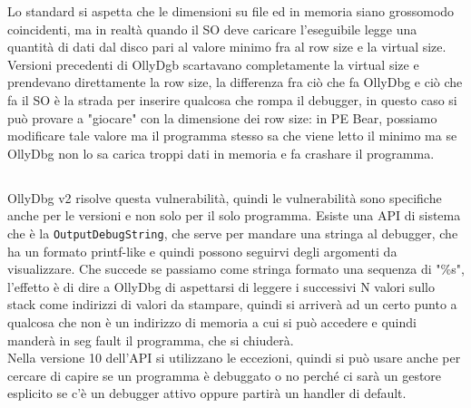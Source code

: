 \documentclass[12pt, oneside]{extbook}
\begin{document}
Lo standard si aspetta che le dimensioni su file ed in memoria siano grossomodo coincidenti, ma in realtà quando il SO deve caricare l'eseguibile legge una quantità di dati dal disco pari al valore minimo fra al row size e la virtual size.\\Versioni precedenti di OllyDgb scartavano completamente la virtual size e prendevano direttamente la row size, la differenza fra ciò che fa OllyDbg e ciò che fa il SO è la strada per inserire qualcosa che rompa il debugger, in questo caso si può provare a "giocare" con la dimensione dei row size:  in PE Bear, possiamo modificare tale valore ma il programma stesso sa che viene letto il minimo ma se OllyDbg non lo sa carica troppi dati in memoria e fa crashare il programma.
\subsection{}
OllyDbg v2 risolve questa vulnerabilità, quindi le vulnerabilità sono specifiche anche per le versioni e non solo per il solo programma. Esiste una API di sistema che è la \texttt{OutputDebugString}, che serve per mandare una stringa al debugger, che ha un formato printf-like e quindi possono seguirvi degli argomenti da visualizzare. Che succede se passiamo come stringa formato una sequenza di "\%s", l'effetto è di dire a OllyDbg di aspettarsi di leggere i successivi N valori sullo stack come indirizzi di valori da stampare, quindi si arriverà ad un certo punto a qualcosa che non è un indirizzo di memoria a cui si può accedere e quindi manderà in seg fault il programma, che si chiuderà.\\Nella versione 10 dell'API si utilizzano le eccezioni, quindi si può usare anche per cercare di capire se un programma è debuggato o no perché ci sarà un gestore esplicito se c'è un debugger attivo oppure partirà un handler di default.
\end{document}
